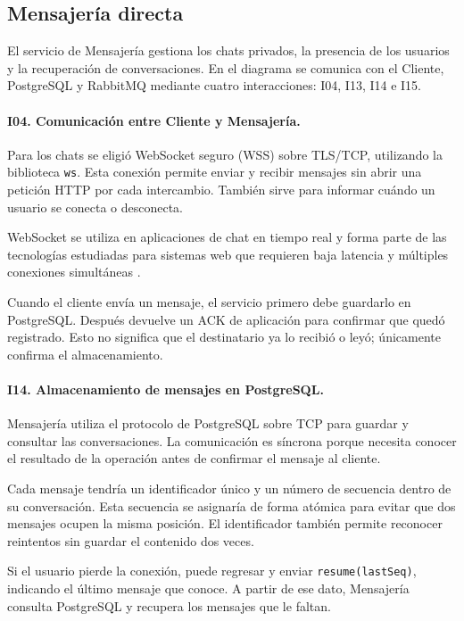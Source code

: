 \documentclass[12pt,a4paper]{article}
\begin{document}
\subsection{Mensajería directa }

El servicio de Mensajería gestiona los chats privados, la presencia de
los usuarios y la recuperación de conversaciones. En el diagrama se
comunica con el Cliente, PostgreSQL y RabbitMQ mediante cuatro
interacciones: I04, I13, I14 e I15.

\paragraph{I04. Comunicación entre Cliente y Mensajería.}

Para los chats se eligió WebSocket seguro (WSS) sobre TLS/TCP, utilizando
la biblioteca \texttt{ws}. Esta conexión permite enviar y recibir mensajes
sin abrir una petición HTTP por cada intercambio. También sirve para
informar cuándo un usuario se conecta o desconecta.

WebSocket se utiliza en aplicaciones de chat en tiempo real y forma parte
de las tecnologías estudiadas para sistemas web que requieren baja
latencia y múltiples conexiones simultáneas
\cite{gangadevi2025chat,diaz2026protocols}.

Cuando el cliente envía un mensaje, el servicio primero debe guardarlo
en PostgreSQL. Después devuelve un ACK de aplicación para confirmar
que quedó registrado. Esto no significa que el destinatario ya lo
recibió o leyó; únicamente confirma el almacenamiento.

\paragraph{I14. Almacenamiento de mensajes en PostgreSQL.}

Mensajería utiliza el protocolo de PostgreSQL sobre TCP para guardar
y consultar las conversaciones. La comunicación es síncrona porque
necesita conocer el resultado de la operación antes de confirmar
el mensaje al cliente.

Cada mensaje tendría un identificador único y un número de secuencia
dentro de su conversación. Esta secuencia se asignaría de forma atómica
para evitar que dos mensajes ocupen la misma posición. El identificador
también permite reconocer reintentos sin guardar el contenido dos veces.

Si el usuario pierde la conexión, puede regresar y enviar
\texttt{resume(lastSeq)}, indicando el último mensaje que conoce.
A partir de ese dato, Mensajería consulta PostgreSQL y recupera los
mensajes que le faltan.
\end{document}

